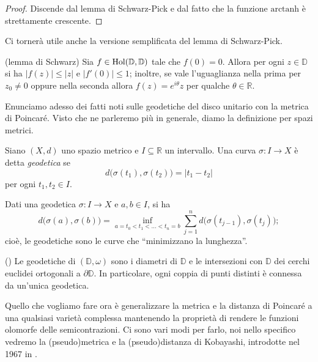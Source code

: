 \begin{proof}
    Discende dal lemma di Schwarz-Pick e dal fatto che la funzione $\text{arctanh}$ è strettamente crescente.
\end{proof}

Ci tornerà utile anche la versione semplificata del lemma di Schwarz-Pick.

\begin{lm}
    (lemma di Schwarz) Sia $f\in\textnormal{Hol}(\mathbb{D},\mathbb{D})$ tale che $f(0)=0$. Allora per ogni $z\in\mathbb{D}$ si ha $|f(z)| \le |z|$ e $|f'(0)| \le 1$; inoltre, se vale l'uguaglianza nella prima per $z_0\not=0$ oppure nella seconda allora $f(z)=e^{i\theta}z$ per qualche $\theta\in\mathbb{R}$.
\end{lm}

Enunciamo adesso dei fatti noti sulle geodetiche del disco unitario con la metrica di Poincaré. Visto che ne parleremo più in generale, diamo la definizione per spazi metrici.

\begin{defn}
    Siano $(X,d)$ uno spazio metrico e $I\subseteq\mathbb{R}$ un intervallo. Una curva $\sigma:I\longrightarrow X$ è detta \textit{geodetica} se
    $$d\big(\sigma(t_1),\sigma(t_2)\big)=|t_1-t_2|$$
    per ogni $t_1,t_2\in I$.
\end{defn}

\begin{oss}
    Dati una geodetica $\sigma:I\longrightarrow X$ e $a,b\in I$, si ha
    $$d\big(\sigma(a),\sigma(b)\big)=\inf_{a=t_0<t_1<\dots<t_n=b} \sum_{j=1}^n d\big(\sigma(t_{j-1}),\sigma(t_j)\big);$$
    cioè, le geodetiche sono le curve che ``minimizzano la lunghezza''.
\end{oss}

\begin{prop}
    (\cite[point (iv) of Proposition 1.2.7]{A5}) Le geodetiche di $(\mathbb{D},\omega)$ sono i diametri di $\mathbb{D}$ e le intersezioni con $\mathbb{D}$ dei cerchi euclidei ortogonali a $\partial\mathbb{D}$. In particolare, ogni coppia di punti distinti è connessa da un'unica geodetica.
\end{prop}

Quello che vogliamo fare ora è generalizzare la metrica e la distanza di Poincaré a una qualsiasi varietà complessa mantenendo la proprietà di rendere le funzioni olomorfe delle semicontrazioni. Ci sono vari modi per farlo, noi nello specifico vedremo la (pseudo)metrica e la (pseudo)distanza di Kobayashi, introdotte nel 1967 in \cite{Ko1}.

